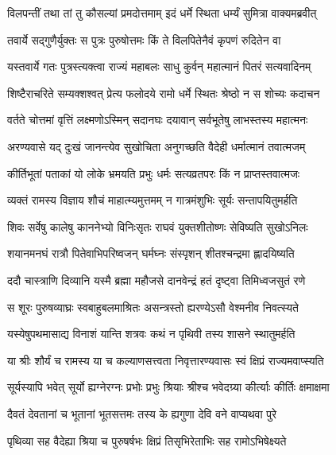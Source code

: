
\twolineshloka
{विलपन्तीं तथा तां तु कौसल्यां प्रमदोत्तमाम्}
{इदं धर्मे स्थिता धर्म्यं सुमित्रा वाक्यमब्रवीत्} %

\twolineshloka
{तवार्ये सद्गुणैर्युक्तः स पुत्रः पुरुषोत्तमः}
{किं ते विलपितेनैवं कृपणं रुदितेन वा} %

\twolineshloka
{यस्तवार्ये गतः पुत्रस्त्यक्त्वा राज्यं महाबलः}
{साधु कुर्वन् महात्मानं पितरं सत्यवादिनम्} %

\twolineshloka
{शिष्टैराचरिते सम्यक्शश्वत् प्रेत्य फलोदये}
{रामो धर्मे स्थितः श्रेष्ठो न स शोच्यः कदाचन} %

\twolineshloka
{वर्तते चोत्तमां वृत्तिं लक्ष्मणोऽस्मिन् सदानघः}
{दयावान् सर्वभूतेषु लाभस्तस्य महात्मनः} %

\twolineshloka
{अरण्यवासे यद् दुःखं जानन्त्येव सुखोचिता}
{अनुगच्छति वैदेही धर्मात्मानं तवात्मजम्} %

\twolineshloka
{कीर्तिभूतां पताकां यो लोके भ्रमयति प्रभुः}
{धर्मः सत्यव्रतपरः किं न प्राप्तस्तवात्मजः} %

\twolineshloka
{व्यक्तं रामस्य विज्ञाय शौचं माहात्म्यमुत्तमम्}
{न गात्रमंशुभिः सूर्यः सन्तापयितुमर्हति} %

\twolineshloka
{शिवः सर्वेषु कालेषु काननेभ्यो विनिःसृतः}
{राघवं युक्तशीतोष्णः सेविष्यति सुखोऽनिलः} %

\twolineshloka
{शयानमनघं रात्रौ पितेवाभिपरिष्वजन्}
{घर्मघ्नः संस्पृशन् शीतश्चन्द्रमा ह्लादयिष्यति} %

\twolineshloka
{ददौ चास्त्राणि दिव्यानि यस्मै ब्रह्मा महौजसे}
{दानवेन्द्रं हतं दृष्ट्वा तिमिध्वजसुतं रणे} %

\twolineshloka
{स शूरः पुरुषव्याघ्रः स्वबाहुबलमाश्रितः}
{असन्त्रस्तो ह्यरण्येऽसौ वेश्मनीव निवत्स्यते} %

\twolineshloka
{यस्येषुपथमासाद्य विनाशं यान्ति शत्रवः}
{कथं न पृथिवी तस्य शासने स्थातुमर्हति} %

\twolineshloka
{या श्रीः शौर्यं च रामस्य या च कल्याणसत्त्वता}
{निवृत्तारण्यवासः स्वं क्षिप्रं राज्यमवाप्स्यति} %

\twolineshloka
{सूर्यस्यापि भवेत् सूर्यो ह्यग्नेरग्नः प्रभोः प्रभुः}
{श्रियाः श्रीश्च भवेदग्र्या कीर्त्याः कीर्तिः क्षमाक्षमा} %

\twolineshloka
{दैवतं देवतानां च भूतानां भूतसत्तमः}
{तस्य के ह्यगुणा देवि वने वाप्यथवा पुरे} %

\twolineshloka
{पृथिव्या सह वैदेह्या श्रिया च पुरुषर्षभः}
{क्षिप्रं तिसृभिरेताभिः सह रामोऽभिषेक्ष्यते} %

